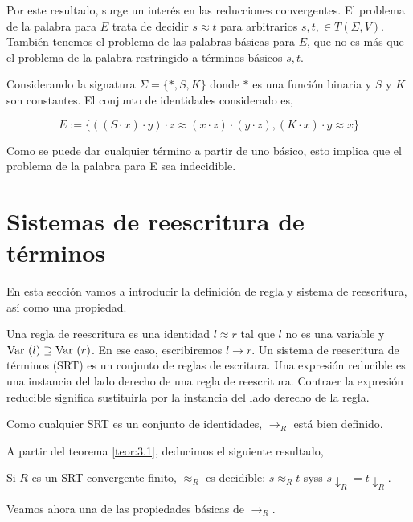 Por este resultado, surge un interés en las reducciones convergentes.
El problema de la palabra para $E$ trata de decidir $s \approx t$ para
arbitrarios $s,t, \in T(\Sigma, V)$. También tenemos el problema de
las palabras básicas para $E$, que no es más que el problema de la
palabra restringido a términos básicos $s,t$.

\begin{ejem}
  Considerando la signatura $\Sigma = \{*, S, K\}$ donde $*$ es una
  función binaria y $S$ y $K$ son constantes. El conjunto de
  identidades considerado es,

  \[E := \{((S \cdot x) \cdot y) \cdot z \approx (x \cdot z) \cdot (y
    \cdot z),(K \cdot x) \cdot y \approx x \} \]

  Como se puede dar cualquier término a partir de uno básico, esto
  implica que el problema de la palabra para E sea indecidible.
\end{ejem}

\section{Sistemas de reescritura de términos}

En esta sección vamos a introducir la definición de regla y sistema de
reescritura, así como una propiedad.

\begin{defi}
  Una regla de reescritura es una identidad $l \approx r$ tal que $l$
  no es una variable y $\mbox{Var }(l) \supseteq \mbox{Var }(r)$. En ese caso,
  escribiremos $l \rightarrow r$. Un sistema de reescritura de
  términos (SRT) es un conjunto de reglas de escritura. Una expresión
  reducible es una instancia del lado derecho de una regla de
  reescritura. Contraer la expresión reducible significa sustituirla
  por la instancia del lado derecho de la regla.
\end{defi}

Como cualquier SRT es un conjunto de identidades, $\rightarrow_R$ está
bien definido.

A partir del teorema \ref{teor:3.1}, deducimos el siguiente resultado,

\begin{teor}
  Si $R$ es un SRT convergente finito, $\approx_R$ es decidible: $s
  \approx_R t$ syss $s \downarrow_R = t \downarrow_R$.
\end{teor}

Veamos ahora una de las propiedades básicas de $\rightarrow_R$.

